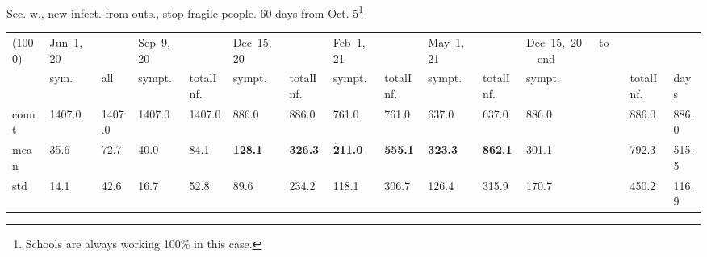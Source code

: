 \documentclass[9pt]{beamer}
\begin{document}
\begin{frame}{Sec. w., new infect. from outs., stop fragile people. 60  days from Oct. 5\footnote{Schools are always working 100\% in this case.}}
\begin{table}[H]
\center
\tiny
\begin{tabular}{p{0.3cm}p{0.3cm}p{0.3cm}p{0.3cm}p{0.3cm}p{0.3cm}p{0.3cm}p{0.3cm}p{0.3cm}p{0.3cm}p{0.3cm}p{0.3cm}p{0.3cm}p{0.4cm}}
\toprule
(1000) &  Jun~1,~20 & &  Sep~9,~20 & & Dec~15,~20 & & Feb~1,~21 & & May~1,~21 & & Dec~15,~20~~~to~~~end   \\
{} &  sym. &  all &  sympt. &  totalInf. &  sympt. &  totalInf. &  sympt. &  totalInf. &  sympt. &  totalInf. &  sympt. &  totalInf.  & days\\
\midrule
count &   1407.0 &                     1407.0 &   1407.0 &                     1407.0 &    886.0 &                      886.0 &    761.0 &                      761.0 &    637.0 &                      637.0 &              886.0 &                   886.0 &  886.0 \\
mean  &     35.6 &                       72.7 &     40.0 &                       84.1 &    \textbf{{\color{cyan}128.1}} &                      \textbf{{\color{cyan}326.3}} &    \textbf{211.0} &                      \textbf{555.1} &    \textbf{323.3} &                      \textbf{862.1} &               301.1 &                   792.3 &  515.5 \\
std   &     14.1 &                       42.6 &     16.7 &                       52.8 &     89.6 &                      234.2 &    118.1 &                      306.7 &    126.4 &                      315.9 &               170.7 &                   450.2 &  116.9 \\
\bottomrule
\end{tabular}

\label{selForceWave2NoFragTab}
\end{table}


\end{frame}
\end{document}
